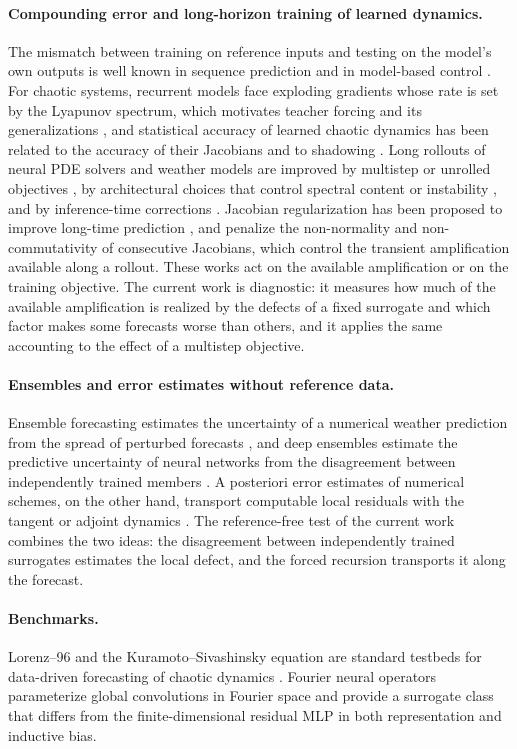 \paragraph{Compounding error and long-horizon training of learned dynamics.}
The mismatch between training on reference inputs and testing on the model's own outputs is well known in sequence prediction \citep{bengio2015,venkatraman2015} and in model-based control \citep{lambert2022}. For chaotic systems, recurrent models face exploding gradients whose rate is set by the Lyapunov spectrum, which motivates teacher forcing and its generalizations \citep{mikhaeil2022,hess2023}, and statistical accuracy of learned chaotic dynamics has been related to the accuracy of their Jacobians and to shadowing \citep{park2024}. Long rollouts of neural PDE solvers and weather models are improved by multistep or unrolled objectives \citep{brandstetter2022,list2025,lam2023}, by architectural choices that control spectral content or instability \citep{lippe2023,mccabe2023}, and by inference-time corrections \citep{pedersen2025}. Jacobian regularization has been proposed to improve long-time prediction \citep{pan2018,nie2026}, and \citet{pervez2026} penalize the non-normality and non-commutativity of consecutive Jacobians, which control the transient amplification available along a rollout. These works act on the available amplification or on the training objective. The current work is diagnostic: it measures how much of the available amplification is realized by the defects of a fixed surrogate and which factor makes some forecasts worse than others, and it applies the same accounting to the effect of a multistep objective.

\paragraph{Ensembles and error estimates without reference data.}
Ensemble forecasting estimates the uncertainty of a numerical weather prediction from the spread of perturbed forecasts \citep{leutbecher2008}, and deep ensembles estimate the predictive uncertainty of neural networks from the disagreement between independently trained members \citep{lakshminarayanan2017}. A posteriori error estimates of numerical schemes, on the other hand, transport computable local residuals with the tangent or adjoint dynamics \citep{estep1995,cao2004,giles2002}. The reference-free test of the current work combines the two ideas: the disagreement between independently trained surrogates estimates the local defect, and the forced recursion transports it along the forecast.

\paragraph{Benchmarks.}
Lorenz--96 \citep{lorenz1996} and the Kuramoto--Sivashinsky equation are standard testbeds for data-driven forecasting of chaotic dynamics \citep{vlachas2018,pathak2018}. Fourier neural operators parameterize global convolutions in Fourier space \citep{li2021} and provide a surrogate class that differs from the finite-dimensional residual MLP in both representation and inductive bias.
